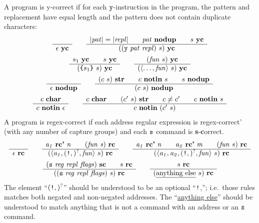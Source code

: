 \documentclass[11pt]{article}
\newcommand\RULE[3][]{\begin{array}{c} #2 \\ \hline #3 \end{array}}
\newcommand\J[1]{\ensuremath{\textbf{#1}}}
\newcommand\cmd[1]{\ensuremath{\text{\texttt{#1}}}}
\renewcommand\arg[1]{\ensuremath{\mathit{#1}}}
\newcommand\angles[1]{\langle #1 \rangle}
\begin{document}
A program is y-correct if for each \cmd{y}-instruction in the program, the pattern and replacement have equal length and the pattern does not contain duplicate characters:
\begin{gather*}
	\RULE{}{\epsilon\ \J{yc}} \qquad
	\RULE{|\arg{pat}| = |\arg{repl}| \qquad \arg{pat}\ \J{nodup} \qquad s\ \J{yc}}{((\cmd{y}\ \arg{pat}\ \arg{repl})\ s)\ \J{yc}} \\
%
	\RULE{s_1\ \J{yc} \qquad s\ \J{yc}}{(\cmd{\{} s_1 \cmd{\}}\ s)\ \J{yc}} \qquad
	\RULE{(\arg{fun}\ s)\ \J{yc}}{(\angles{\ldots, \arg{fun}}\ s)\ \J{yc}} \\
	\RULE{}{\epsilon\ \J{nodup}} \qquad
	\RULE{(c\ s)\ \J{str} \qquad c\ \J{notin}\ s \qquad s\ \J{nodup}}{(c\ s)\ \J{nodup}} \\
	\RULE{c\ \J{char}}{c\ \J{notin}\ \epsilon} \qquad
	\RULE{c\ \J{char} \qquad (c'\ s)\ \J{str} \qquad c \not= c' \qquad c\ \J{notin}\ s}{c\ \J{notin}\ (c'\ s)}
\end{gather*}
%
A program is regex-correct if each address regular expression is regex-correct' (with any number of capture groups) and each \cmd{s} command is \textbf{s}-\textbf{c}orrect.
\begin{gather*}
	\RULE{}{\epsilon\ \J{rc}} \qquad
	\RULE{\arg{a_1}\ \J{rc'}\ \arg{n} \qquad (\arg{fun}\ \arg{s})\ \J{rc}}{(\angles{\arg{a_1}, (\cmd{!},)^?, \arg{fun}}\ s)\ \J{rc}} \qquad
	\RULE{\arg{a_1}\ \J{rc'}\ \arg{n} \qquad \arg{a_2}\ \J{rc'}\ \arg{m} \qquad (\arg{fun}\ s)\ \J{rc}}{(\angles{\arg{a_1}, \arg{a_2}, (\cmd{!},)^?, \arg{fun}}\ s)\ \J{rc}} \\
	\RULE{(\cmd{s}\ \arg{reg}\ \arg{repl}\ \arg{flags})\ \J{sc} \qquad s\ \J{rc}}{((\cmd{s}\ \arg{reg}\ \arg{repl}\ \arg{flags})\ \arg{s})\ \J{rc}} \qquad
	\RULE{s\ \J{rc}}{(\text{\underline{anything else}}\ s)\ \J{rc}}
\end{gather*}
The element ``$(\cmd{!},)^?$'' should be understood to be an optional ``\cmd{!},''; i.e.\ those rules matches both negated and non-negated addresses.
The ``\underline{anything else}'' should be understood to match anything that is not a command with an address or an \cmd{s} command.
\end{document}
